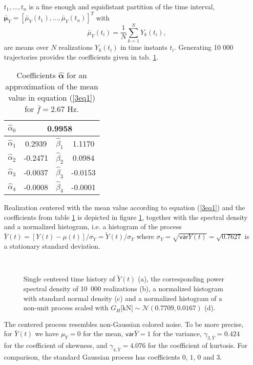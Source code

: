 \documentclass[preprint,12pt,authoryear]{elsarticle}
\newcommand{\bs}[1]{{\boldsymbol{#1}}}
\begin{document}
$t_1,\dots,t_n$ is a fine enough and equidistant partition of the time interval, ${\bs{\bar{\mu}}_Y}=[\bar{\mu}_Y(t_1),\dots,\bar{\mu}_Y(t_n)]^T$ with
\begin{equation*}
\bar{\mu}_Y(t_i)=\frac{1}{N}\sum_{k=1}^NY_k(t_i),
\end{equation*}
are means over $N$ realizations $Y_k(t_i)$ in time instants $t_i$. Generating 10 000 trajectories provides the coefficients given in tab. \ref{3tab1}.
\begin{table}
	\centering
	\caption{Coefficients $\bs{\hat{\alpha}}$ for an approximation of the mean value in equation (\ref{3eq1}) for $\bar{f}=2.67$ Hz.}
	\begin{tabular}{|c|c|c|c|}\hline
	$\hat{\alpha}_0$ & \multicolumn{3}{c|}{0.9958} \\\hline
	$\hat{\alpha}_1$ & 0.2939 & $\hat{\beta}_1$ & 1.1170 \\
	$\hat{\alpha}_2$ & -0.2471 & $\hat{\beta}_2$ & 0.0984 \\
	$\hat{\alpha}_3$ & -0.0037 & $\hat{\beta}_3$ & -0.0153 \\
	$\hat{\alpha}_4$ & -0.0008 & $\hat{\beta}_4$ & -0.0001 \\\hline
	\end{tabular}
	\label{3tab1}
\end{table}
Realization centered with the mean value according to equation (\ref{3eq1}) and the coefficients from table \ref{3tab1} is  depicted in figure \ref{3fig2}, together with the spectral density and a normalized histogram, i.e. a histogram of the process $\bar{Y}(t)=[Y(t)-\mu(t)]/\sigma_Y=\tilde{Y}(t)/\sigma_Y$ where $\sigma_Y=\sqrt{\mathsf{var}Y(t)}=\sqrt{0.7627}$ is a stationary standard deviation.
\begin{figure}
	\centering
  \\
	\caption{Single centered time history of $\tilde{Y}(t)$ (a), the corresponding power spectral density of 10~000 realizations (b), a normalized histogram with standard normal density (c) and a normalized histogram of a non-unit process scaled with $G_H\mbox{[kN]}\sim \mathcal{N}(0.7709,0.0167)$ (d).}
	\label{3fig2}
\end{figure}
The centered process resembles non-Gaussian colored noise. To be more precise, for $\bar{Y}(t)$ we have $\mu_{\bar{Y}}=0$ for the mean, $\mathsf{var}\bar{Y}=1$ for the variance, $\gamma_{3,\bar{Y}}=0.424$ for the coefficient of skewness, and $\gamma_{4,\bar{Y}}=4.076$ for the coefficient of kurtosis. For comparison, the standard Gaussian process has coefficients $0$, $1$, $0$ and $3$.
\end{document}
